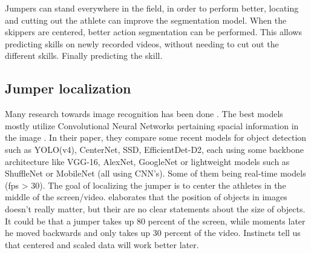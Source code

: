 Jumpers can stand everywhere in the field, in order to perform better, locating and cutting out the athlete can improve the segmentation model. When the skippers are centered, better action segmentation can be performed. This allows predicting skills on newly recorded videos, without needing to cut out the different skills. Finally predicting the skill.

\subsection{Jumper localization}
\label{subsec:jumper localization}


Many research towards image recognition has been done \autocite{Zou_2023}. The best models mostly utilize Convolutional Neural Networks pertaining spacial information in the image \autocite{Zaidi_2021}. In their paper, they compare some recent models for object detection such as YOLO(v4), CenterNet, SSD, EfficientDet-D2, each using some backbone architecture like VGG-16, AlexNet, GoogleNet or lightweight models such as ShuffleNet or MobileNet (all using CNN's). Some of them being real-time models (fps > 30).
The goal of localizing the jumper is to center the athletes in the middle of the screen/video. \textcite{Bharadiya_2023} elaborates that the position of objects in images doesn't really matter, but their are no clear statements about the size of objects. It could be that a jumper takes up 80 percent of the screen, while moments later he moved backwards and only takes up 30 percent of the video. Instincts tell us that centered and scaled data will work better later.

